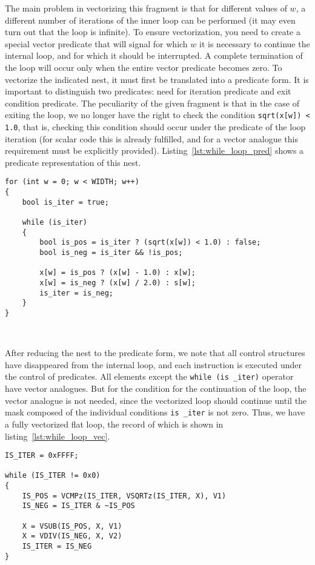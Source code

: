 \documentclass[
11pt,%
tightenlines,%
twoside,%
onecolumn,%
nofloats,%
nobibnotes,%
nofootinbib,%
superscriptaddress,%
noshowpacs,%
centertags]%
{revtex4}
\begin{document}
The main problem in vectorizing this fragment is that for different values of $ w $, a different number of iterations of the inner loop can be performed (it may even turn out that the loop is infinite).
To ensure vectorization, you need to create a special vector predicate that will signal for which $w$ it is necessary to continue the internal loop, and for which it should be interrupted.
A complete termination of the loop will occur only when the entire vector predicate becomes zero.
To vectorize the indicated nest, it must first be translated into a predicate form.
It is important to distinguish two predicates: need for iteration predicate and exit condition predicate.
The peculiarity of the given fragment is that in the case of exiting the loop, we no longer have the right to check the condition \texttt{sqrt(x[w]) < 1.0}, that is, checking this condition should occur under the predicate of the loop iteration (for scalar code this is already fulfilled, and for a vector analogue this requirement must be explicitly provided).
Listing~\ref{lst:while_loop_pred} shows a predicate representation of this nest.

\begin{lstlisting}[caption={The predicate form of a flat loop containing a loop with a non-constant number of iterations},label={lst:while_loop_pred}]
for (int w = 0; w < WIDTH; w++)
{
    bool is_iter = true;

    while (is_iter)
    {
        bool is_pos = is_iter ? (sqrt(x[w]) < 1.0) : false;
        bool is_neg = is_iter && !is_pos;    
    
        x[w] = is_pos ? (x[w] - 1.0) : x[w];
        x[w] = is_neg ? (x[w] / 2.0) : s[w];
        is_iter = is_neg;
    }
}
\end{lstlisting}

\

After reducing the nest to the predicate form, we note that all control structures have disappeared from the internal loop, and each instruction is executed under the control of predicates.
All elements except the \texttt{while (is \_iter)} operator have vector analogues.
But for the condition for the continuation of the loop, the vector analogue is not needed, since the vectorized loop should continue until the mask composed of the individual conditions \texttt{is \_iter} is not zero.
Thus, we have a fully vectorized flat loop, the record of which is shown in listing~\ref{lst:while_loop_vec}.

\begin{lstlisting}[caption={The vector form of a flat loop containing a loop with a non-constant number of iterations},label={lst:while_loop_vec}]
IS_ITER = 0xFFFF;

while (IS_ITER != 0x0)
{
    IS_POS = VCMPz(IS_ITER, VSQRTz(IS_ITER, X), V1)
    IS_NEG = IS_ITER & ~IS_POS
    
    X = VSUB(IS_POS, X, V1)
    X = VDIV(IS_NEG, X, V2)
    IS_ITER = IS_NEG
}
\end{lstlisting}
\end{document}

